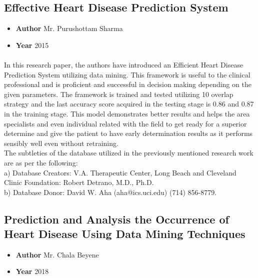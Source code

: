 \documentclass[oneside,12pt]{Classes/VTU}
\begin{document}
    \subsection{Effective Heart Disease Prediction System}
    \begin{itemize}
    	\item \textbf{Author} Mr. Purushottam Sharma
    	\item \textbf{Year} 2015
    \end{itemize}
	\paragraph{}
    In this research paper, the authors have introduced an Efficient Heart Disease Prediction System utilizing data mining. This framework is useful to the clinical professional and is proficient and successful in decision making depending on the given parameters. The framework is trained and tested utilizing 10 overlap strategy and the last accuracy score acquired in the testing stage is 0.86 and 0.87 in the training stage. This model demonstrates better results and helps the area specialists and even individual related with the field to get ready for a superior determine and give the patient to have early determination results as it performs sensibly well even without retraining.
    \\
    The subtleties of the database utilized in the previously mentioned research work are as per the following:
    \\
    	a) Database Creators: V.A. Therapeutic Center, Long Beach and Cleveland Clinic Foundation: Robert Detrano, M.D., Ph.D.
    	\\
    	b) Database Donor: David W. Aha (aha@ics.uci.edu) (714) 856-8779.
    \subsection{Prediction and Analysis the Occurrence of Heart Disease Using Data Mining Techniques}
    \begin{itemize}
    	\item \textbf{Author} Mr. Chala Beyene
    	\item \textbf{Year} 2018
    \end{itemize}
\end{document}
